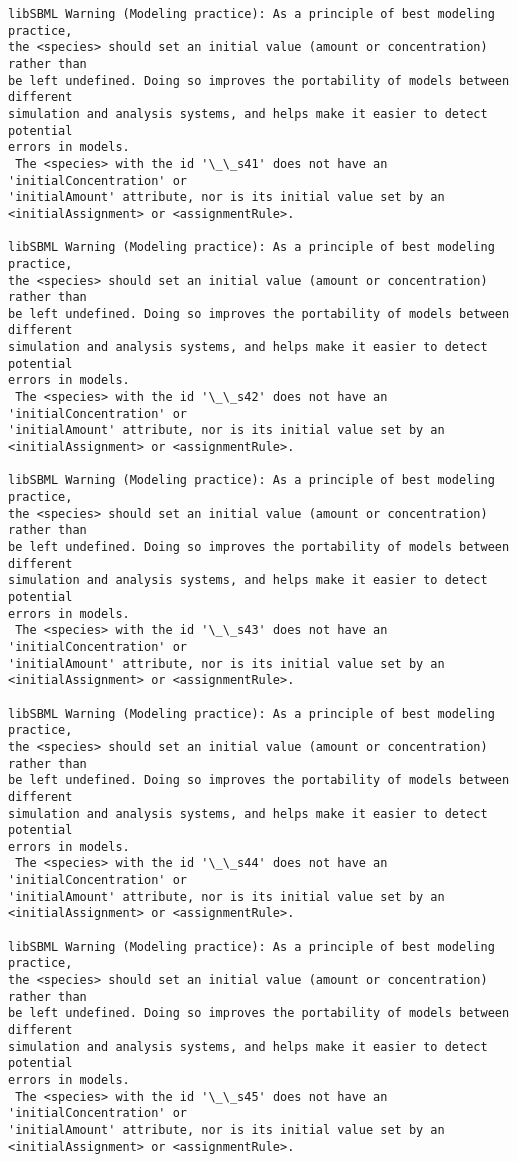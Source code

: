 \documentclass[11pt]{article}
\begin{document}
\begin{Verbatim}[commandchars=\\\{\}]
libSBML Warning (Modeling practice): As a principle of best modeling practice,
the <species> should set an initial value (amount or concentration) rather than
be left undefined. Doing so improves the portability of models between different
simulation and analysis systems, and helps make it easier to detect potential
errors in models.
 The <species> with the id '\_\_s41' does not have an 'initialConcentration' or
'initialAmount' attribute, nor is its initial value set by an
<initialAssignment> or <assignmentRule>.

libSBML Warning (Modeling practice): As a principle of best modeling practice,
the <species> should set an initial value (amount or concentration) rather than
be left undefined. Doing so improves the portability of models between different
simulation and analysis systems, and helps make it easier to detect potential
errors in models.
 The <species> with the id '\_\_s42' does not have an 'initialConcentration' or
'initialAmount' attribute, nor is its initial value set by an
<initialAssignment> or <assignmentRule>.

libSBML Warning (Modeling practice): As a principle of best modeling practice,
the <species> should set an initial value (amount or concentration) rather than
be left undefined. Doing so improves the portability of models between different
simulation and analysis systems, and helps make it easier to detect potential
errors in models.
 The <species> with the id '\_\_s43' does not have an 'initialConcentration' or
'initialAmount' attribute, nor is its initial value set by an
<initialAssignment> or <assignmentRule>.

libSBML Warning (Modeling practice): As a principle of best modeling practice,
the <species> should set an initial value (amount or concentration) rather than
be left undefined. Doing so improves the portability of models between different
simulation and analysis systems, and helps make it easier to detect potential
errors in models.
 The <species> with the id '\_\_s44' does not have an 'initialConcentration' or
'initialAmount' attribute, nor is its initial value set by an
<initialAssignment> or <assignmentRule>.

libSBML Warning (Modeling practice): As a principle of best modeling practice,
the <species> should set an initial value (amount or concentration) rather than
be left undefined. Doing so improves the portability of models between different
simulation and analysis systems, and helps make it easier to detect potential
errors in models.
 The <species> with the id '\_\_s45' does not have an 'initialConcentration' or
'initialAmount' attribute, nor is its initial value set by an
<initialAssignment> or <assignmentRule>.


\end{Verbatim}
\end{document}
